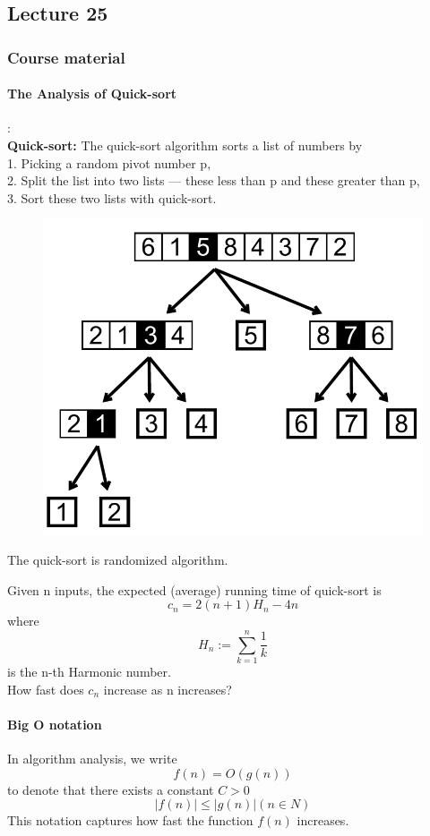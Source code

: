 \documentclass{article}
\begin{document}
\subsection{Lecture 25}
\subsubsection{Course material}
\paragraph{The Analysis of Quick-sort}:\\
\textbf{Quick-sort:} The quick-sort algorithm sorts a list of numbers by\\
    1. Picking a random pivot number p,\\
    2. Split the list into two lists — these less than p and these greater than p,\\
    3. Sort these two lists with quick-sort.
\begin{figure}[H]
    \centering
    \includegraphics{0121}
\end{figure}
\par The quick-sort is randomized algorithm.
\par Given n inputs, the expected (average) running time of quick-sort is
$$c_n=2(n+1)H_n-4n$$
where
$$H_n:=\sum_{k=1}^{n}\frac{1}{k}$$
is the n-th Harmonic number.\\
How fast does $c_n$ increase as n increases?\\
\paragraph{Big O notation}
In algorithm analysis, we write
$$f(n)=O(g(n))$$
to denote that there exists a constant $C>0$
$$|f(n)|\leq |g(n)| (n\in N)$$
This notation captures how fast the function $f(n)$ increases.
\end{document}
